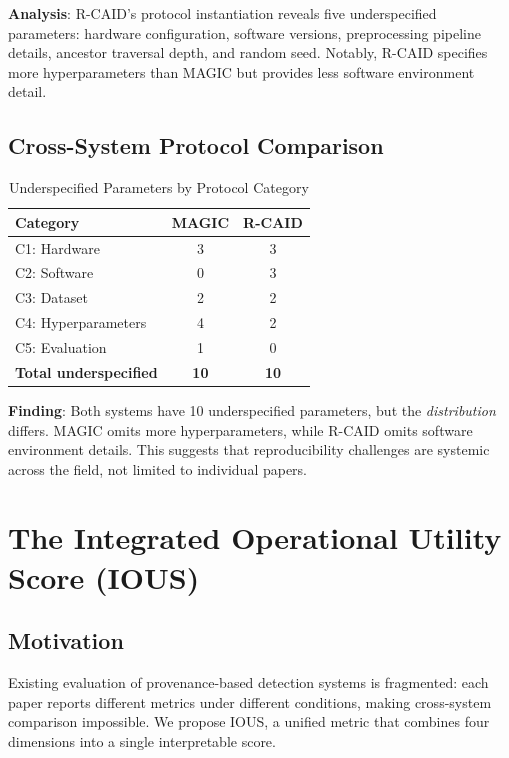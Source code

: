 \documentclass[11pt,a4paper]{article}
\newcommand{\ious}{\textsc{IOUS}}
\begin{document}
\textbf{Analysis}: R-CAID's protocol instantiation reveals five underspecified parameters: hardware configuration, software versions, preprocessing pipeline details, ancestor traversal depth, and random seed. Notably, R-CAID specifies more hyperparameters than MAGIC but provides less software environment detail.

\subsection{Cross-System Protocol Comparison}

\begin{table}[H]
\centering
\caption{Underspecified Parameters by Protocol Category}
\label{tab:underspecified}
\begin{tabular}{@{}lcc@{}}
\toprule
\textbf{Category} & \textbf{MAGIC} & \textbf{R-CAID} \\
\midrule
C1: Hardware & 3 & 3 \\
C2: Software & 0 & 3 \\
C3: Dataset & 2 & 2 \\
C4: Hyperparameters & 4 & 2 \\
C5: Evaluation & 1 & 0 \\
\midrule
\textbf{Total underspecified} & \textbf{10} & \textbf{10} \\
\bottomrule
\end{tabular}
\end{table}

\textbf{Finding}: Both systems have 10 underspecified parameters, but the \emph{distribution} differs. MAGIC omits more hyperparameters, while R-CAID omits software environment details. This suggests that reproducibility challenges are systemic across the field, not limited to individual papers.

\section{The Integrated Operational Utility Score (IOUS)}
\label{sec:ious}

\subsection{Motivation}

Existing evaluation of provenance-based detection systems is fragmented: each paper reports different metrics under different conditions, making cross-system comparison impossible. We propose \ious, a unified metric that combines four dimensions into a single interpretable score.
\end{document}
